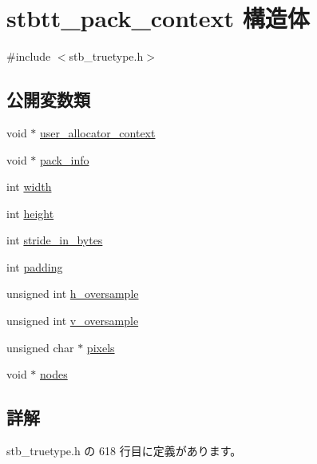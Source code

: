 \hypertarget{structstbtt__pack__context}{}\section{stbtt\+\_\+pack\+\_\+context 構造体}
\label{structstbtt__pack__context}


{\ttfamily \#include $<$stb\+\_\+truetype.\+h$>$}

\subsection*{公開変数類}
\begin{DoxyCompactItemize}
\item 
void $\ast$ \mbox{\hyperlink{structstbtt__pack__context_a45fddc4d4adfcef58aa08ad2874cedc0}{user\+\_\+allocator\+\_\+context}}
\item 
void $\ast$ \mbox{\hyperlink{structstbtt__pack__context_a303a72f0a39479b439fa531925be7031}{pack\+\_\+info}}
\item 
int \mbox{\hyperlink{structstbtt__pack__context_a5da0b7b5d3b82d5fc75ea1c8945183fa}{width}}
\item 
int \mbox{\hyperlink{structstbtt__pack__context_a817ec010d7f09ba9776517c5a87f13a7}{height}}
\item 
int \mbox{\hyperlink{structstbtt__pack__context_abbe9a25aae0e26b81a5f7339fac23801}{stride\+\_\+in\+\_\+bytes}}
\item 
int \mbox{\hyperlink{structstbtt__pack__context_a1191f34fa995910044191584f0d7a803}{padding}}
\item 
unsigned int \mbox{\hyperlink{structstbtt__pack__context_aee1019f9634cad49fa07e8e1f897d6b7}{h\+\_\+oversample}}
\item 
unsigned int \mbox{\hyperlink{structstbtt__pack__context_a4b55efa27ef36e7f258afe92921784c0}{v\+\_\+oversample}}
\item 
unsigned char $\ast$ \mbox{\hyperlink{structstbtt__pack__context_a6549105fd1922df983fbe036b9db4a1a}{pixels}}
\item 
void $\ast$ \mbox{\hyperlink{structstbtt__pack__context_a11a73fa6860e6be1ac039fcca9db2c7c}{nodes}}
\end{DoxyCompactItemize}


\subsection{詳解}


 stb\+\_\+truetype.\+h の 618 行目に定義があります。



